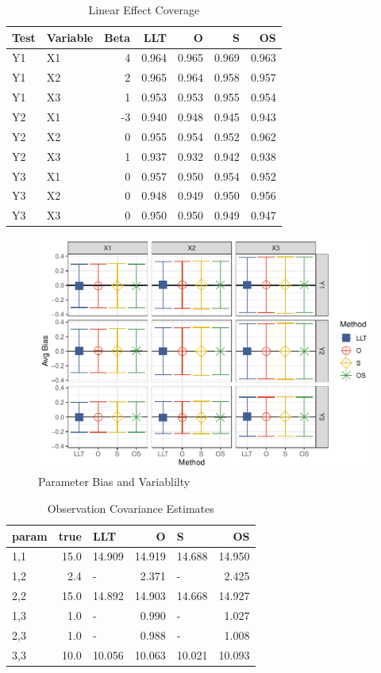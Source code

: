 \documentclass[
]{article}
\begin{document}
\begin{longtable}[t]{l|l|r|r|r|r|r}
\caption{\label{tab:unnamed-chunk-8}Linear Effect Coverage}\\
\hline
Test & Variable & Beta & LLT & O & S & OS\\
\hline
Y1 & X1 & 4 & 0.964 & 0.965 & 0.969 & 0.963\\
\hline
Y1 & X2 & 2 & 0.965 & 0.964 & 0.958 & 0.957\\
\hline
Y1 & X3 & 1 & 0.953 & 0.953 & 0.955 & 0.954\\
\hline
Y2 & X1 & -3 & 0.940 & 0.948 & 0.945 & 0.943\\
\hline
Y2 & X2 & 0 & 0.955 & 0.954 & 0.952 & 0.962\\
\hline
Y2 & X3 & 1 & 0.937 & 0.932 & 0.942 & 0.938\\
\hline
Y3 & X1 & 0 & 0.957 & 0.950 & 0.954 & 0.952\\
\hline
Y3 & X2 & 0 & 0.948 & 0.949 & 0.950 & 0.956\\
\hline
Y3 & X3 & 0 & 0.950 & 0.950 & 0.949 & 0.947\\
\hline
\end{longtable}

\begin{figure}
\centering
\includegraphics{FullSimulation_files/figure-latex/unnamed-chunk-9-1.pdf}
\caption{\label{fig:unnamed-chunk-9}Parameter Bias and Variablilty}
\end{figure}

\begin{longtable}[t]{l|r|l|r|l|r}
\caption{\label{tab:unnamed-chunk-10}Observation Covariance Estimates}\\
\hline
param & true & LLT & O & S & OS\\
\hline
1,1 & 15.0 & 14.909 & 14.919 & 14.688 & 14.950\\
\hline
1,2 & 2.4 & - & 2.371 & - & 2.425\\
\hline
2,2 & 15.0 & 14.892 & 14.903 & 14.668 & 14.927\\
\hline
1,3 & 1.0 & - & 0.990 & - & 1.027\\
\hline
2,3 & 1.0 & - & 0.988 & - & 1.008\\
\hline
3,3 & 10.0 & 10.056 & 10.063 & 10.021 & 10.093\\
\hline
\end{longtable}
\end{document}
